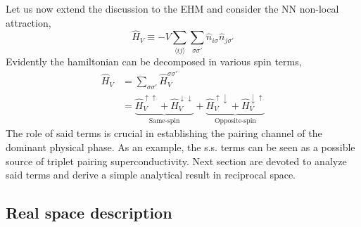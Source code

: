 Let us now extend the discussion to the EHM and consider the NN non-local attraction,
\begin{equation}\label{eq:extended-hubbard-nonlocal-interaction}
	\hat H_V \equiv - V \sum_{\langle ij \rangle} \sum_{\sigma \sigma'} \hat n_{i\sigma} \hat n_{j\sigma'}
\end{equation}
Evidently the hamiltonian can be decomposed in various spin terms,
\begin{align}
	\hat H_V &= \sum_{\sigma \sigma'} \hat H_V^{\sigma\sigma'} \nonumber \\
	&= \underbrace{
		\hat H_V^{\uparrow\uparrow} + \hat H_V^{\downarrow\downarrow}
	}_\text{Same-spin} + \underbrace{
		\hat H_V^{\uparrow\downarrow} + \hat H_V^{\downarrow\uparrow}
	}_\text{Opposite-spin} \label{eq:ehm-non-local-ss-os-terms}
\end{align}
The role of said terms is crucial in establishing the pairing channel of the dominant physical phase. As an example, the s.s. terms can be seen as a possible source of triplet pairing superconductivity. Next section are devoted to analyze said terms and derive a simple analytical result in reciprocal space.

\subsection{Real space description}\label{subsec:mft-discussion-real-non-local}

